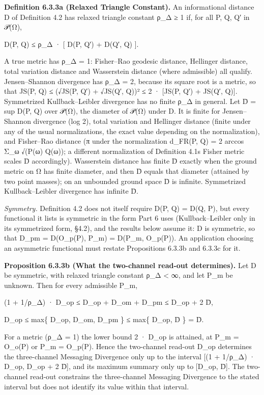 \documentclass[
]{article}
\begin{document}
\textbf{Definition 6.3.3a (Relaxed Triangle Constant).} An informational
distance D of Definition 4.2 has relaxed triangle constant ρ\_Δ ≥ 1 if,
for all P, Q, Q′ in 𝒫(Ω),

D(P, Q) ≤ ρ\_Δ · {[} D(P, Q′) + D(Q′, Q) {]}.

A true metric has ρ\_Δ = 1: Fisher--Rao geodesic distance, Hellinger
distance, total variation distance and Wasserstein distance (where
admissible) all qualify. Jensen--Shannon divergence has ρ\_Δ = 2,
because its square root is a metric, so that JS(P, Q) ≤ (√JS(P, Q′) +
√JS(Q′, Q))² ≤ 2 · {[}JS(P, Q′) + JS(Q′, Q){]}. Symmetrized
Kullback--Leibler divergence has no finite ρ\_Δ in general. Let D̄ = sup
D(P, Q) over 𝒫(Ω), the diameter of 𝒫(Ω) under D. It is finite for
Jensen--Shannon divergence (log 2), total variation and Hellinger
distance (finite under any of the usual normalizations, the exact value
depending on the normalization), and Fisher--Rao distance (π under the
normalization d\_FR(P, Q) = 2 arccos Σ\_ω √(P(ω) Q(ω)); a different
normalization of Definition 4.1\textquotesingle s Fisher metric scales D̄
accordingly). Wasserstein distance has finite D̄ exactly when the ground
metric on Ω has finite diameter, and then D̄ equals that diameter
(attained by two point masses); on an unbounded ground space D̄ is
infinite. Symmetrized Kullback--Leibler divergence has infinite D̄.

\emph{Symmetry.} Definition 4.2 does not itself require D(P, Q) = D(Q,
P), but every functional it lists is symmetric in the form Part 6 uses
(Kullback--Leibler only in its symmetrized form, §4.2), and the results
below assume it: D is symmetric, so that D\_pm = D(O\_p(P), P\_m) =
D(P\_m, O\_p(P)). An application choosing an asymmetric functional must
restate Propositions 6.3.3b and 6.3.3c for it.

\textbf{Proposition 6.3.3b (What the two-channel read-out determines).}
Let D be symmetric, with relaxed triangle constant ρ\_Δ \textless{} ∞,
and let P\_m be unknown. Then for every admissible P\_m,

(1 + 1/ρ\_Δ) · D\_op ≤ D\_op + D\_om + D\_pm ≤ D\_op + 2 D̄,

D\_op ≤ max\{ D\_op, D\_om, D\_pm \} ≤ max\{ D\_op, D̄ \} = D̄.

For a metric (ρ\_Δ = 1) the lower bound 2 · D\_op is attained, at P\_m =
O\_o(P) or P\_m = O\_p(P). Hence the two-channel read-out D\_op
determines the three-channel Messaging Divergence only up to the
interval {[}(1 + 1/ρ\_Δ) · D\_op, D\_op + 2 D̄{]}, and its maximum
summary only up to {[}D\_op, D̄{]}. The two-channel read-out constrains
the three-channel Messaging Divergence to the stated interval but does
not identify its value within that interval.
\end{document}
